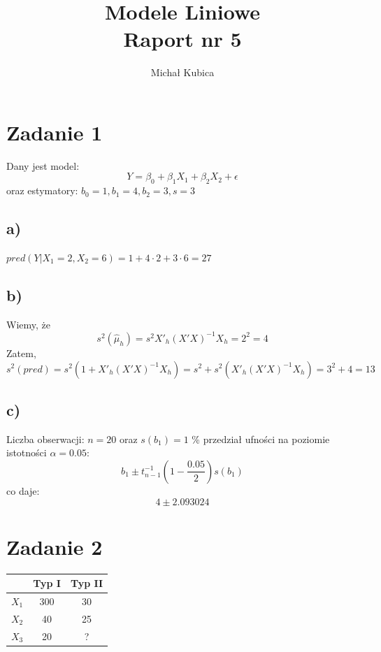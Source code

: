 \documentclass[9pt]{article}  %
\begin{document}
\author{Michał Kubica}
\title{Modele Liniowe \\ Raport nr 5}       
\maketitle                     %

\section{Zadanie 1}            %





  Dany jest model:
  $$Y = \beta_0 + \beta_1 X_1 + \beta_2 X_2 + \epsilon  $$
  oraz estymatory: $b_0 = 1, b_1 = 4, b_2 = 3, s=3$
  \subsection{a)}
  
  $pred\left(Y|X_1 = 2, X_2=6\right) = 1+4\cdot 2 + 3 \cdot 6 = 27$
  \subsection{b)}
  Wiemy, że
  $$s^2( \hat{\mu}_h ) = s^2 X'_h(X'X)^{-1}X_h = 2^2 = 4 $$
  Zatem,
  $$ s^2(pred) = s^2( 1+X'_h(X'X)^{-1}X_h ) = s^2 +s^2(X'_h(X'X)^{-1}X_h) = 3^2+4 = 13  $$
  
  
  \subsection{c)}
  
  Liczba obserwacji: $n=20$ oraz $s(b_1) = 1$ \% przedział ufności na poziomie istotności $\alpha=0.05$:
  $$b_1 \pm t_{n-1}^{-1} \left( 1-\frac{0.05}{2}\right) s(b_1)$$
  co daje:
  $$ 4 \pm 2.093024$$
  
\section{Zadanie 2}
  
  \begin{table}[H]
  \centering
    \begin{tabular}{c|cc}
     & Typ I & Typ II  \\ \hline
     $X_1$ & 300 & 30  \\ 
     $X_2$ & 40 & 25   \\ 
     $X_3$ & 20  & ? \\ 
  \end{tabular} 
  \end{table}
\end{document}
